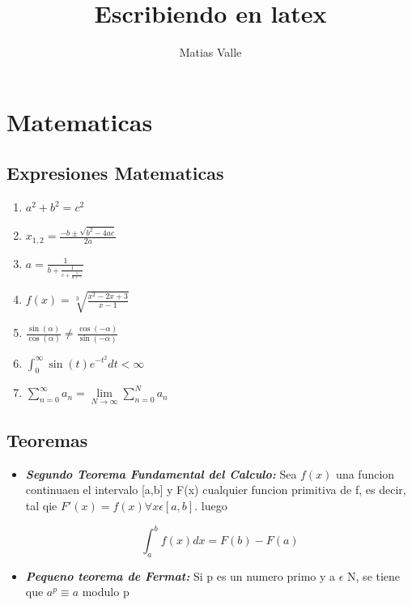 \documentclass[11pt,spanish,a4paper]{article}
\begin{document}
\newcommand\al{\alpha}
\newcommand\noi{\noindent}
\newcommand\re{\mbox{Re}}
\newcommand\im{\mbox{Im}}
\newcommand\Arg{\mbox{Arg}}

\title{Escribiendo en latex}

\author{Matias Valle}

\maketitle

\section{Matematicas}

\subsection{Expresiones Matematicas}
\begin{enumerate}

\item $a^2 + b^2 = c^2$

\item $ \displaystyle x_{1,2} = \frac{-b\pm \sqrt{b^2-4ac}}{2a} $

\item $a = \frac{1}{b+\frac{1}{c+\frac{1}{d+\cdots}}}$

\item $f(x) = \sqrt[3]{\frac{x^2-2x+3}{x-1}}$

\item $\frac{\sin(\alpha)}{\cos(\alpha)} \neq \frac{\cos(-\alpha)}{\sin(-\alpha)} $

\item $\displaystyle \int_0^\infty \sin(t) e^{-t^2} dt < \infty $

\item $ \displaystyle \sum_{n=0}^{\infty} a_n = \lim\limits_{N\to\infty} \sum_{n=0}^{N} a_n$ 

\end{enumerate}

\subsection{Teoremas}
\begin{itemize}
\item {\bfseries\itshape Segundo Teorema Fundamental del Calculo:} Sea $f(x)$ una funcion continuaen el intervalo [a,b] y F(x) cualquier funcion primitiva de f, es decir, tal qie $F'(x)=f(x) \forall x \epsilon [a,b]$. luego

\[\int_a^b f(x) dx = F(b)-F(a)\]

\item {\bfseries\itshape Pequeno teorema de Fermat:} Si p es un numero primo y a $\epsilon$ N, se tiene que $a^p \equiv a$ modulo p 
\end{itemize}
\end{document}
